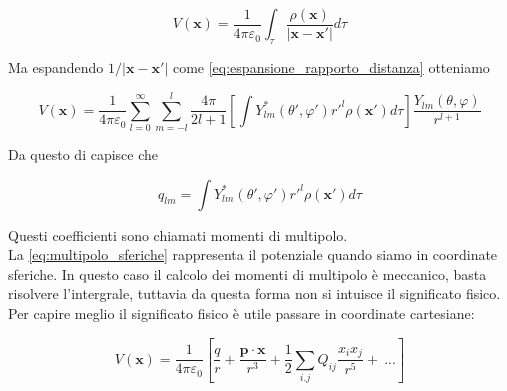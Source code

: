 \begin{equation*}
    V(\mathbf{x}) = \frac{1}{4 \pi \varepsilon_0} \int_{\tau}\frac{\rho(\mathbf{x})}{|\mathbf{x} - \mathbf{x'}|} d\tau
\end{equation*}

Ma espandendo $1/|\mathbf{x} - \mathbf{x'}|$ come \ref{eq:espansione_rapporto_distanza} otteniamo 

\begin{tcolorbox}[colback=yellow!10!white, colframe=orange!70!black, boxrule=0.8pt]
\begin{equation}
    V(\mathbf{x}) =  \frac{1}{4 \pi \varepsilon_0} \sum_{l = 0}^{\infty} \sum_{m = -l}^l  \frac{4 \pi}{2l +1} \left [ \int Y^*_{lm} (\theta',\varphi') r'^l \rho(\mathbf{x'}) d\tau \right] \frac{Y_{lm} (\theta , \varphi)}{r^{l +1}}
    \label{eq:multipolo_sferiche}
\end{equation}
\end{tcolorbox}

Da questo di capisce che 

\begin{tcolorbox}[colback=yellow!10!white, colframe=orange!70!black, boxrule=0.8pt]
\begin{equation}
    q_{lm} = \int Y^*_{lm} (\theta',\varphi') r'^l \rho(\mathbf{x'}) d\tau 
\end{equation}
\end{tcolorbox}

Questi  coefficienti sono chiamati momenti di multipolo. \\

La \ref{eq:multipolo_sferiche} rappresenta il potenziale quando siamo in coordinate sferiche. In questo caso il calcolo dei momenti di multipolo è meccanico, basta risolvere l'intergrale, tuttavia da questa forma non si intuisce il significato fisico. \\
Per capire meglio il significato fisico è utile passare in coordinate cartesiane:

\begin{tcolorbox}[colback=yellow!10!white, colframe=orange!70!black, boxrule=0.8pt]
\begin{equation}
    V(\mathbf{x}) = \frac{1}{4\pi \varepsilon_0} \left[ \frac{q}{r} + \frac{\mathbf{p} \cdot \mathbf{x}}{r^3} + \frac{1}{2} \sum_{i.j} Q_{ij} \frac{x_i x_j}{r^5} +\  ...\right]
    \label{eq:multipoli_cartesiane}
\end{equation}
\end{tcolorbox}

